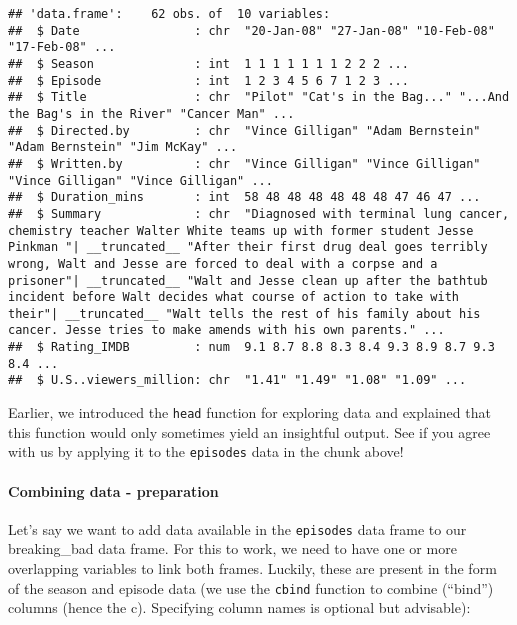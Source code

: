 \documentclass[
]{article}
\newenvironment{Shaded}{\begin{snugshade}}{\end{snugshade}}
\newcommand{\NormalTok}[1]{#1}
\newcommand{\SpecialCharTok}[1]{\textcolor[rgb]{0.00,0.00,0.00}{#1}}
\begin{document}
\begin{verbatim}
## 'data.frame':    62 obs. of  10 variables:
##  $ Date                : chr  "20-Jan-08" "27-Jan-08" "10-Feb-08" "17-Feb-08" ...
##  $ Season              : int  1 1 1 1 1 1 1 2 2 2 ...
##  $ Episode             : int  1 2 3 4 5 6 7 1 2 3 ...
##  $ Title               : chr  "Pilot" "Cat's in the Bag..." "...And the Bag's in the River" "Cancer Man" ...
##  $ Directed.by         : chr  "Vince Gilligan" "Adam Bernstein" "Adam Bernstein" "Jim McKay" ...
##  $ Written.by          : chr  "Vince Gilligan" "Vince Gilligan" "Vince Gilligan" "Vince Gilligan" ...
##  $ Duration_mins       : int  58 48 48 48 48 48 48 47 46 47 ...
##  $ Summary             : chr  "Diagnosed with terminal lung cancer, chemistry teacher Walter White teams up with former student Jesse Pinkman "| __truncated__ "After their first drug deal goes terribly wrong, Walt and Jesse are forced to deal with a corpse and a prisoner"| __truncated__ "Walt and Jesse clean up after the bathtub incident before Walt decides what course of action to take with their"| __truncated__ "Walt tells the rest of his family about his cancer. Jesse tries to make amends with his own parents." ...
##  $ Rating_IMDB         : num  9.1 8.7 8.8 8.3 8.4 9.3 8.9 8.7 9.3 8.4 ...
##  $ U.S..viewers_million: chr  "1.41" "1.49" "1.08" "1.09" ...
\end{verbatim}

Earlier, we introduced the \texttt{head} function for exploring data and
explained that this function would only sometimes yield an insightful
output. See if you agree with us by applying it to the \texttt{episodes}
data in the chunk above!

\hypertarget{combining-data---preparation}{%
\paragraph{Combining data -
preparation}\label{combining-data---preparation}}

Let's say we want to add data available in the \texttt{episodes} data
frame to our breaking\_bad data frame. For this to work, we need to have
one or more overlapping variables to link both frames. Luckily, these
are present in the form of the season and episode data (we use the
\texttt{cbind} function to combine (``bind'') columns (hence the c).
Specifying column names is optional but advisable):

\begin{Shaded}
\end{Shaded}
\end{document}

